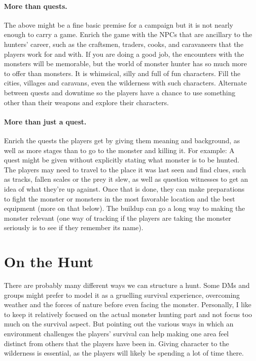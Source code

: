 \paragraph{More than quests.} The above might be a fine basic premise for a campaign but it is not nearly enough to carry a game. Enrich the game with the NPCs that are ancillary to the hunters' career, such as the craftsmen, traders, cooks, and caravaneers that the players work for and with. If you are doing a good job, the encounters with the monsters will be memorable, but the world of monster hunter has so much more to offer than monsters. It is whimsical, silly and full of fun characters. Fill the cities, villages and caravans, even the wilderness with such characters. Alternate between quests and downtime so the players have a chance to use something other than their weapons and explore their characters.

\hbWideBottomArtFirstPageFix
\paragraph{More than just a quest.} Enrich the quests the players get by giving them meaning and background, as well as more stages than to go to the monster and killing it. For example: A quest might be given without explicitly stating what monster is to be hunted. The players may need to travel to the place it was last seen and find clues, such as tracks, fallen scales or the prey it slew, as well as question witnesses to get an idea of what they're up against. Once that is done, they can make preparations to fight the monster or monsters in the most favorable location and the best equipment (more on that below). The buildup can go a long way to making the monster relevant (one way of tracking if the players are taking the monster seriously is to see if they remember its name).

\section{On the Hunt}
There are probably many different ways we can structure a hunt. Some DMs and groups might prefer to model it as a gruelling survival experience, overcoming weather and the forces of nature before even facing the monster. Personally, I like to keep it relatively focused on the actual monster hunting part and not focus too much on the survival aspect. But pointing out the various ways in which an environment challenges the players' survival can help making one area feel distinct from others that the players have been in. Giving character to the wilderness is essential, as the players will likely be spending a lot of time there.

